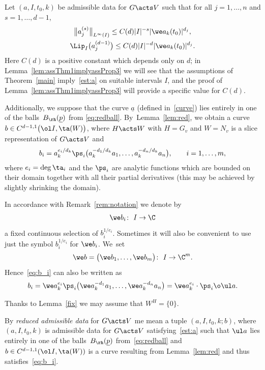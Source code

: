 Let $(a, I, t_0, k)$ be admissible data for $G \acts V$ such that
for all
$j = 1,\dots,n$ and $ s = 1,\dots,d-1$,
 \begin{gather}%
 \big\|a_j^{(s)} \big\|_{L^\infty(I)} \le C(d) |I|^{-s} |\we a_k (t_0)|^{d_j},\nonumber
 \\
 \Lip_I \big(a_j^{(d-1)}\big) \le C(d) |I|^{-d} |\we a_k (t_0)|^{d_j}.
\label{est:a}
 \end{gather}
Here $C(d)$ is a positive constant which depends only on $d$; in
Lemma~\ref{lem:assThm1implyassProp3} we will see that the assumptions of Theorem~\ref{main}
imply~\eqref{est:a} on suitable intervals $I$, and the proof of Lemma~\ref{lem:assThm1implyassProp3}
will provide a specific value for $C(d)$.

Additionally,
we suppose that the curve $\underline a$ (defined in~\eqref{curve}) lies entirely in one of the balls~$B_\rh(\underline p)$ from
\eqref{eq:redball}. By~Lemma~\ref{lem:red}, we obtain a curve $b \in C^{d-1,1}\big(\ol I,\ta(W)\big)$, where $H \acts W$ with $H=G_v$ and $W=N_v$ is a
slice representation of $G \acts V$ and
\begin{gather} \label{eq:b_i}
 b_i = a_k^{e_i/d_k} \ps_i \big(a_k^{-d_1/d_k} a_1, \dots, a_k^{-d_n/d_k} a_n\big), \qquad i = 1,\dots,m,
\end{gather}
 where $e_i = \deg \ta_i$ and the $\ps_i$ are analytic functions which are bounded on their domain together with all
 their partial derivatives (this may be achieved by slightly shrinking the domain).

In accordance with Remark~\ref{rem:notation} we denote by
\begin{gather*}
 \we b_i \colon\ I \to \C
\end{gather*}
a fixed continuous selection of $b_i^{1/e_i}$. Sometimes it will also be convenient to use just the
symbol $b_i^{1/e_i}$ for $\we b_i$. We~set
\begin{gather*}
 \we b = \big(\we b_1,\dots,\we b_m\big) \colon\ I \to \C^m.
\end{gather*}
Hence~\eqref{eq:b_i} can also be written as
\begin{gather*}
 b_i = \we a_k^{e_i} \ps_i \big(\we a_k^{-d_1} a_1, \dots, \we a_k^{-d_n} a_n\big) = \we a_k^{e_i}\cdot \ps_i \o \ul a.
\end{gather*}

Thanks to Lemma~\ref{fix} we may assume that $W^H = \{0\}$.


\begin{Definition}
 By \emph{reduced admissible data} for $G \acts V$ me mean a tuple $(a, I, t_0, k; b)$, where
 $(a, I, t_0, k)$ is admissible data for $G \acts V$
 satisfying~\eqref{est:a}
 such that $\ul a$
 lies entirely in one of the balls~$B_\rh(\underline p)$ from~\eqref{eq:redball}
 and $b \in C^{d-1,1}(\ol I,\ta(W))$ is a curve resulting from Lemma~\ref{lem:red}
 and thus satisfies~\eqref{eq:b_i}.
\end{Definition}


